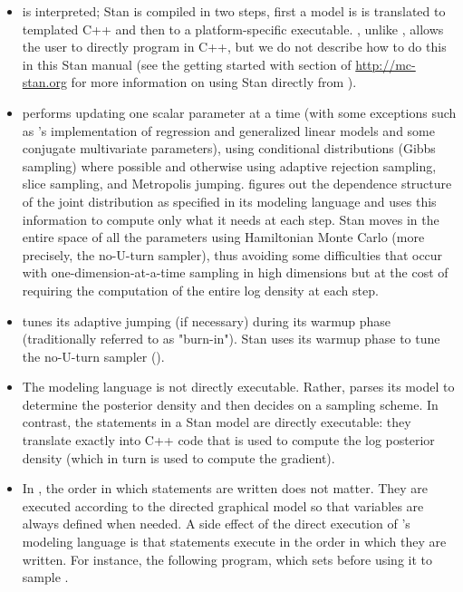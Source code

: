 \begin{itemize}
\item \BUGS is interpreted; Stan is compiled in two steps, first a
  model is is translated to templated C++ and then to a
  platform-specific executable.  \Stan, unlike \BUGS, allows the user
  to directly program in C++, but we do not describe how to do this in
  this Stan manual (see the getting started with \Cpp section of
  \url{http://mc-stan.org} for more information on using Stan directly
  from \Cpp). 
\item \BUGS performs \MCMC updating one scalar parameter at a time
  (with some exceptions such as \JAGS's implementation of regression
  and generalized linear models and some conjugate multivariate
  parameters), using conditional distributions (Gibbs sampling) where
  possible and otherwise using adaptive rejection sampling, slice
  sampling, and Metropolis jumping.  \BUGS figures out the dependence
  structure of the joint distribution as specified in its modeling
  language and uses this information to compute only what it needs at
  each step.  Stan moves in the entire space of all the parameters
  using Hamiltonian Monte Carlo (more precisely, the no-U-turn
  sampler), thus avoiding some difficulties that occur with
  one-dimension-at-a-time sampling in high dimensions but at the cost
  of requiring the computation of the entire log density at each step.
\item \BUGS tunes its adaptive jumping (if necessary) during its
  warmup phase (traditionally referred to as "burn-in").  Stan uses
  its warmup phase to tune the no-U-turn sampler (\NUTS).
\item The \BUGS modeling language is not directly executable.  Rather,
  \BUGS parses its model to determine the posterior density and then
  decides on a sampling scheme.  In contrast, the statements in a Stan
  model are directly executable: they translate exactly into C++ code
  that is used to compute the log posterior density (which in turn is
  used to compute the gradient).
\item In \BUGS, the order in which statements are written does not
  matter.  They are executed according to the directed graphical model
  so that variables are always defined when needed.  A side effect of
  the direct execution of \Stan's modeling language is that statements
  execute in the order in which they are written.  For instance, the
  following \Stan program, which sets  before using it to
  sample .
%
\begin{stancode}

\end{stancode}
\end{itemize}
